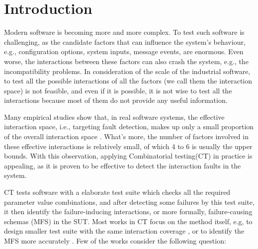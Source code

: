 \documentclass{sig-alternate-05-2015}
\begin{document}

%
%


%
%

%
%
\printccsdesc




\section{Introduction}
Modern software is becoming more and more complex. To test such software is challenging, as the candidate factors that can influence the system's behaviour, e.g., configuration options, system inputs, message events, are enormous. Even worse, the interactions between these factors can also crash the system, e.g., the incompatibility problems. In consideration of the scale of the industrial software, to test all the possible interactions of all the factors (we call them the interaction space) is not feasible, and even if it is possible, it is not wise to test all the interactions because most of them do not provide any useful information.

Many empirical studies show that, in real software systems, the effective interaction space, i.e., targeting fault detection, makes up only a small proportion of the overall interaction space \cite{kuhn2002investigation,kuhn2004software}. What's more, the number of factors involved in these effective interactions is relatively small, of which 4 to 6 is usually the upper bounds\cite{kuhn2002investigation}. With this observation, applying Combinatorial testing(CT) in practice is appealing, as it is proven to be effective to detect the interaction faults in the system.

CT tests software with a elaborate test suite which checks all the required parameter value combinations, and after detecting some failures by this test suite, it then identify the failure-inducing interactions, or more formally, failure-causing schemas (MFS) in the SUT. Most works in CT focus on the method itself, e.g, to design smaller test suite with the same interaction coverage \cite{cohen1997aetg,cohen2003augmenting,lei2008ipog,jia2015learning}, or to identify the MFS more accurately \cite{martinez2009locating,nie2011minimal,zhang2011characterizing,niu2013identifying}. Few of the works consider the following question:
\end{document}
